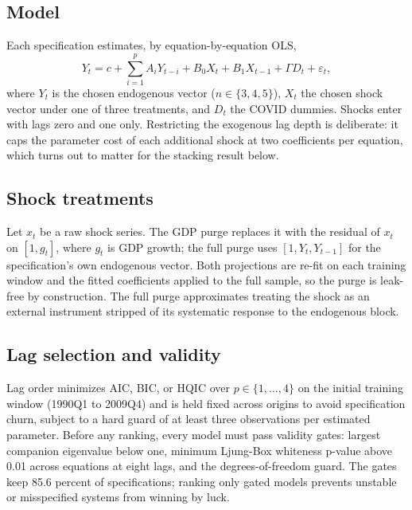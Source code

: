 \documentclass[conference]{IEEEtran}
\begin{document}
\subsection{Model}
Each specification estimates, by equation-by-equation OLS,
\begin{equation}
Y_t = c + \sum_{i=1}^{p} A_i Y_{t-i} + B_0 X_t + B_1 X_{t-1} + \Gamma D_t + \varepsilon_t,
\end{equation}
where $Y_t$ is the chosen endogenous vector ($n \in \{3,4,5\}$), $X_t$ the chosen shock vector under one of three treatments, and $D_t$ the COVID dummies. Shocks enter with lags zero and one only. Restricting the exogenous lag depth is deliberate: it caps the parameter cost of each additional shock at two coefficients per equation, which turns out to matter for the stacking result below.

\subsection{Shock treatments}
Let $x_t$ be a raw shock series. The GDP purge replaces it with the residual of $x_t$ on $[1, g_t]$, where $g_t$ is GDP growth; the full purge uses $[1, Y_t, Y_{t-1}]$ for the specification's own endogenous vector. Both projections are re-fit on each training window and the fitted coefficients applied to the full sample, so the purge is leak-free by construction. The full purge approximates treating the shock as an external instrument stripped of its systematic response to the endogenous block.

\subsection{Lag selection and validity}
Lag order minimizes AIC, BIC, or HQIC over $p \in \{1,\dots,4\}$ on the initial training window (1990Q1 to 2009Q4) and is held fixed across origins to avoid specification churn, subject to a hard guard of at least three observations per estimated parameter. Before any ranking, every model must pass validity gates: largest companion eigenvalue below one, minimum Ljung-Box whiteness p-value above 0.01 across equations at eight lags, and the degrees-of-freedom guard. The gates keep 85.6 percent of specifications; ranking only gated models prevents unstable or misspecified systems from winning by luck.
\end{document}
